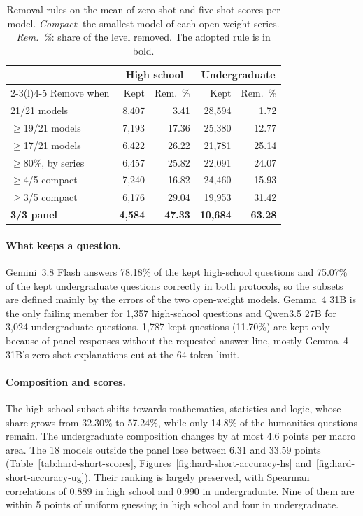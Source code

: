\begin{table}[t]
\centering
\footnotesize
\setlength{\tabcolsep}{3.5pt}
\begin{tabular}{@{}lrrrr@{}}
\toprule
& \multicolumn{2}{c}{High school} & \multicolumn{2}{c}{Undergraduate} \\
\cmidrule(lr){2-3}\cmidrule(l){4-5}
Remove when & Kept & Rem.\ \% & Kept & Rem.\ \% \\
\midrule
21/21 models & 8,407 & 3.41 & 28,594 & 1.72 \\
$\geq$19/21 models & 7,193 & 17.36 & 25,380 & 12.77 \\
$\geq$17/21 models & 6,422 & 26.22 & 21,781 & 25.14 \\
$\geq$80\%, by series & 6,457 & 25.82 & 22,091 & 24.07 \\
$\geq$4/5 compact & 7,240 & 16.82 & 24,460 & 15.93 \\
$\geq$3/5 compact & 6,176 & 29.04 & 19,953 & 31.42 \\
\textbf{3/3 panel} & \textbf{4,584} & \textbf{47.33} & \textbf{10,684} & \textbf{63.28} \\
\bottomrule
\end{tabular}
\caption{Removal rules on the mean of zero-shot and five-shot scores per
model. \emph{Compact}: the smallest model of each open-weight series.
\emph{Rem.\ \%}: share of the level removed. The adopted rule is in bold.}
\label{tab:hard-short-rules}
\end{table}

\paragraph{What keeps a question.} Gemini~3.8 Flash answers 78.18\% of the
kept high-school questions and 75.07\% of the kept undergraduate questions
correctly in both protocols, so the subsets are defined mainly by the errors
of the two open-weight models. Gemma~4 31B is the only failing member for
1,357 high-school questions and Qwen3.5 27B for 3,024 undergraduate
questions. 1,787 kept questions (11.70\%) are kept only because of panel
responses without the requested answer line, mostly Gemma~4 31B's zero-shot
explanations cut at the 64-token limit.

\paragraph{Composition and scores.} The high-school subset shifts towards
mathematics, statistics and logic, whose share grows from 32.30\% to
57.24\%, while only 14.8\% of the humanities questions remain. The
undergraduate composition changes by at most 4.6 points per macro area.
The 18 models outside the panel lose between 6.31 and 33.59 points
(Table~\ref{tab:hard-short-scores}, Figures~\ref{fig:hard-short-accuracy-hs}
and~\ref{fig:hard-short-accuracy-ug}). Their ranking is largely preserved,
with Spearman correlations of 0.889 in high school and 0.990 in
undergraduate. Nine of them are within 5 points of uniform guessing in high
school and four in undergraduate.

